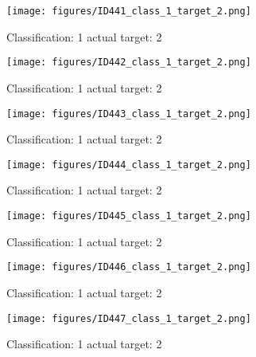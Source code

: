 \begin{figure}[h!]
\begin{center}
\texttt{[image: figures/ID441\_class\_1\_target\_2.png]}
\end{center}
\caption{ Classification: 1 actual target: 2}
\label{fig:ID441_class_1_target_2}
\end{figure}
\begin{figure}[h!]
\begin{center}
\texttt{[image: figures/ID442\_class\_1\_target\_2.png]}
\end{center}
\caption{ Classification: 1 actual target: 2}
\label{fig:ID442_class_1_target_2}
\end{figure}
\begin{figure}[h!]
\begin{center}
\texttt{[image: figures/ID443\_class\_1\_target\_2.png]}
\end{center}
\caption{ Classification: 1 actual target: 2}
\label{fig:ID443_class_1_target_2}
\end{figure}
\begin{figure}[h!]
\begin{center}
\texttt{[image: figures/ID444\_class\_1\_target\_2.png]}
\end{center}
\caption{ Classification: 1 actual target: 2}
\label{fig:ID444_class_1_target_2}
\end{figure}
\begin{figure}[h!]
\begin{center}
\texttt{[image: figures/ID445\_class\_1\_target\_2.png]}
\end{center}
\caption{ Classification: 1 actual target: 2}
\label{fig:ID445_class_1_target_2}
\end{figure}
\begin{figure}[h!]
\begin{center}
\texttt{[image: figures/ID446\_class\_1\_target\_2.png]}
\end{center}
\caption{ Classification: 1 actual target: 2}
\label{fig:ID446_class_1_target_2}
\end{figure}
\begin{figure}[h!]
\begin{center}
\texttt{[image: figures/ID447\_class\_1\_target\_2.png]}
\end{center}
\caption{ Classification: 1 actual target: 2}
\label{fig:ID447_class_1_target_2}
\end{figure}
